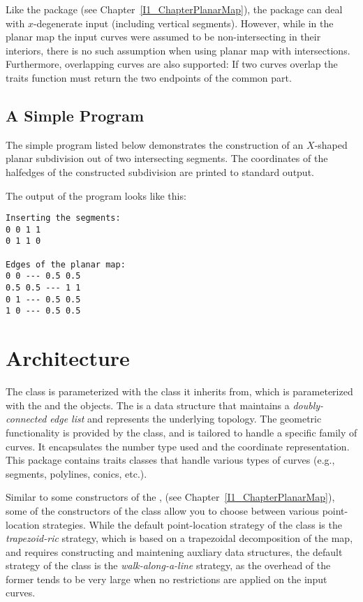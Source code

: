 Like the  package (see Chapter~\ref{I1_ChapterPlanarMap}), 
the  package can deal with $x$-degenerate 
input (including vertical segments). However, while in the planar map the input
curves were assumed to be non-intersecting in their interiors, there is no 
such assumption when using planar map with intersections. Furthermore, 
overlapping curves are also supported: If two curves overlap the traits 
 function must return the two endpoints of the
common part.

\subsection{A Simple Program}
\label{ssec:example1}
The simple program listed below demonstrates the construction of an
$X$-shaped planar subdivision out of two intersecting segments.
The coordinates of the halfedges of the constructed subdivision are
printed to standard output.


The output of the program looks like this:
\begin{verbatim}
Inserting the segments:
0 0 1 1
0 1 1 0

Edges of the planar map:
0 0 --- 0.5 0.5
0.5 0.5 --- 1 1
0 1 --- 0.5 0.5
1 0 --- 0.5 0.5
\end{verbatim}

\section{Architecture}

The  class 
is parameterized with the  class it inherits from, which 
is parameterized with the  and the  objects. The
 is a data structure that maintains a
{\em doubly-connected edge list} and represents the underlying topology.
The geometric functionality is provided by the  class, and is
tailored to handle a specific family of curves. It encapsulates the
number type used and the coordinate representation. This package
contains traits classes that handle various types of curves (e.g.,
segments, polylines, conics, etc.).

Similar to some constructors of the , 
(see Chapter~\ref{I1_ChapterPlanarMap}), some of the constructors of the
 class allow you to choose between
various point-location strategies. While the default point-location
strategy of the  class is the {\it trapezoid-ric} strategy,
which is based on a trapezoidal decomposition of the map, and requires
constructing and maintening auxliary data structures, the default strategy
of the  class is the
{\it walk-along-a-line\/} strategy, as the overhead of the former
tends to be very large when no restrictions are applied on the input curves.

